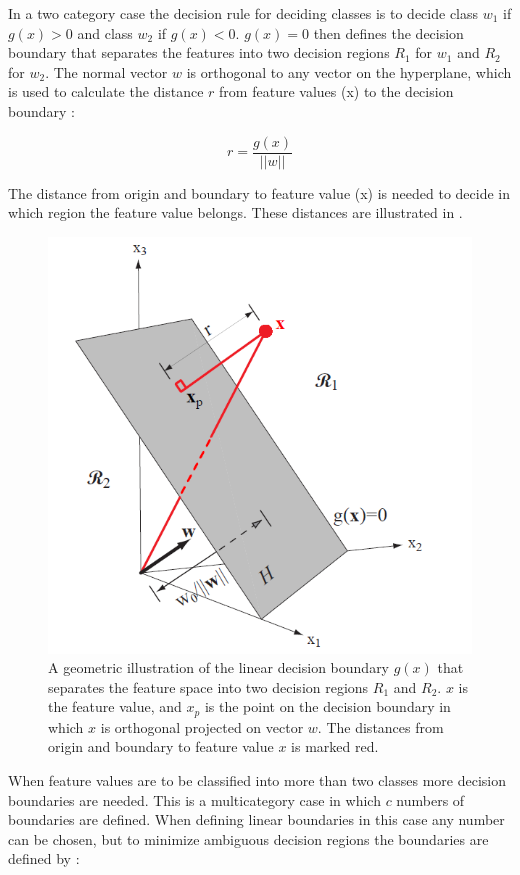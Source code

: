 In a two category case the decision rule for deciding classes is to decide class $w_1$ if $g(x) > 0$ and class $w_2$ if $g(x) < 0$. $g(x) = 0$ then defines the decision boundary that separates the features into two decision regions $R_1$ for $w_1$ and $R_2$ for $w_2$. The normal vector $w$ is orthogonal to any vector on the hyperplane, which is used to calculate the distance $r$ from feature values (x) to the decision boundary \cite{Duda2000}:

\begin{equation} \label{eq:featureValueDistance}
r = \frac{g(x)}{||w||}
\end{equation} 

The distance from origin and boundary to feature value (x) is needed to decide in which region the feature value belongs. \cite{Duda2000} These distances are illustrated in .

\begin{figure}[H]                 
	\includegraphics[width=.4\textwidth]{figures/xBackground/geolda}  
	\caption{A geometric illustration of the linear decision boundary $g(x)$ that separates the feature space into two decision regions $R_1$ and $R_2$. $x$ is the feature value, and $x_p$ is the point on the decision boundary in which $x$ is orthogonal projected on vector $w$. The distances from origin and boundary to feature value $x$ is marked red. \cite{Duda2000}}
	\label{fig:geolda} 
\end{figure}

When feature values are to be classified into more than two classes more decision boundaries are needed. This is a multicategory case in which $c$ numbers of boundaries are defined. When defining linear boundaries in this case any number can be chosen, but to minimize ambiguous decision regions the boundaries are defined by \cite{Duda2000}:

